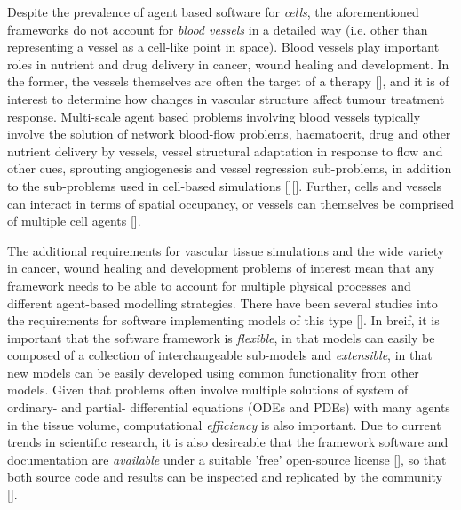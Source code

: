 \documentclass[superscriptaddress, a4paper]{article}
\begin{document}
Despite the prevalence of agent based software for \emph{cells}, the aforementioned frameworks do not account for \emph{blood vessels} in a detailed way (i.e. other than representing a vessel as a cell-like point in space). Blood vessels play important roles in nutrient and drug delivery in cancer, wound healing and development. In the former, the vessels themselves are often the target of a therapy [], and it is of interest to determine how changes in vascular structure affect tumour treatment response. Multi-scale agent based problems involving blood vessels typically involve the solution of network blood-flow problems, haematocrit, drug and other nutrient delivery by vessels, vessel structural adaptation in response to flow and other cues, sprouting angiogenesis and vessel regression sub-problems, in addition to the sub-problems used in cell-based simulations [][]. Further, cells and vessels can interact in terms of spatial occupancy, or vessels can themselves be comprised of multiple cell agents []. 

The additional requirements for vascular tissue simulations and the wide variety in cancer, wound healing and development problems of interest mean that any framework needs to be able to account for multiple physical processes and different agent-based modelling strategies. There have been several studies into the requirements for software implementing models of this type []. In breif, it is important that the software framework is \emph{flexible}, in that models can easily be composed of a collection of interchangeable sub-models and \emph{extensible}, in that new models can be easily developed using common functionality from other models. Given that problems often involve multiple solutions of system of ordinary- and partial- differential equations (ODEs and PDEs) with many agents in the tissue volume, computational \emph{efficiency} is also important. Due to current trends in scientific research, it is also desireable that the framework software and documentation are  \emph{available} under a suitable 'free' open-source license [], so that both source code and results can be inspected and replicated by the community [].
\end{document}
